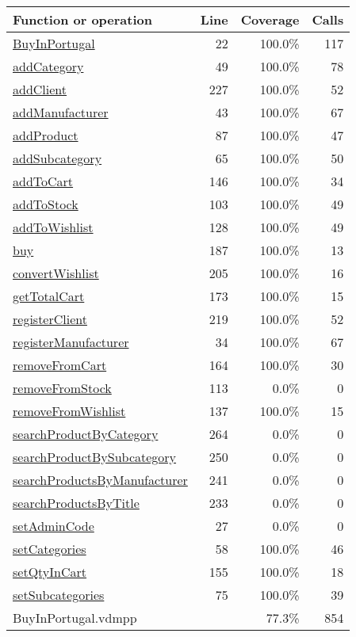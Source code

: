 \bigskip
\begin{longtable}{|l|r|r|r|}
\hline
Function or operation & Line & Coverage & Calls \\
\hline
\hline
\hyperref[BuyInPortugal:22]{BuyInPortugal} & 22&100.0\% & 117 \\
\hline
\hyperref[addCategory:49]{addCategory} & 49&100.0\% & 78 \\
\hline
\hyperref[addClient:227]{addClient} & 227&100.0\% & 52 \\
\hline
\hyperref[addManufacturer:43]{addManufacturer} & 43&100.0\% & 67 \\
\hline
\hyperref[addProduct:87]{addProduct} & 87&100.0\% & 47 \\
\hline
\hyperref[addSubcategory:65]{addSubcategory} & 65&100.0\% & 50 \\
\hline
\hyperref[addToCart:146]{addToCart} & 146&100.0\% & 34 \\
\hline
\hyperref[addToStock:103]{addToStock} & 103&100.0\% & 49 \\
\hline
\hyperref[addToWishlist:128]{addToWishlist} & 128&100.0\% & 49 \\
\hline
\hyperref[buy:187]{buy} & 187&100.0\% & 13 \\
\hline
\hyperref[convertWishlist:205]{convertWishlist} & 205&100.0\% & 16 \\
\hline
\hyperref[getTotalCart:173]{getTotalCart} & 173&100.0\% & 15 \\
\hline
\hyperref[registerClient:219]{registerClient} & 219&100.0\% & 52 \\
\hline
\hyperref[registerManufacturer:34]{registerManufacturer} & 34&100.0\% & 67 \\
\hline
\hyperref[removeFromCart:164]{removeFromCart} & 164&100.0\% & 30 \\
\hline
\hyperref[removeFromStock:113]{removeFromStock} & 113&0.0\% & 0 \\
\hline
\hyperref[removeFromWishlist:137]{removeFromWishlist} & 137&100.0\% & 15 \\
\hline
\hyperref[searchProductByCategory:264]{searchProductByCategory} & 264&0.0\% & 0 \\
\hline
\hyperref[searchProductBySubcategory:250]{searchProductBySubcategory} & 250&0.0\% & 0 \\
\hline
\hyperref[searchProductsByManufacturer:241]{searchProductsByManufacturer} & 241&0.0\% & 0 \\
\hline
\hyperref[searchProductsByTitle:233]{searchProductsByTitle} & 233&0.0\% & 0 \\
\hline
\hyperref[setAdminCode:27]{setAdminCode} & 27&0.0\% & 0 \\
\hline
\hyperref[setCategories:58]{setCategories} & 58&100.0\% & 46 \\
\hline
\hyperref[setQtyInCart:155]{setQtyInCart} & 155&100.0\% & 18 \\
\hline
\hyperref[setSubcategories:75]{setSubcategories} & 75&100.0\% & 39 \\
\hline
\hline
BuyInPortugal.vdmpp & & 77.3\% & 854 \\
\hline
\end{longtable}

